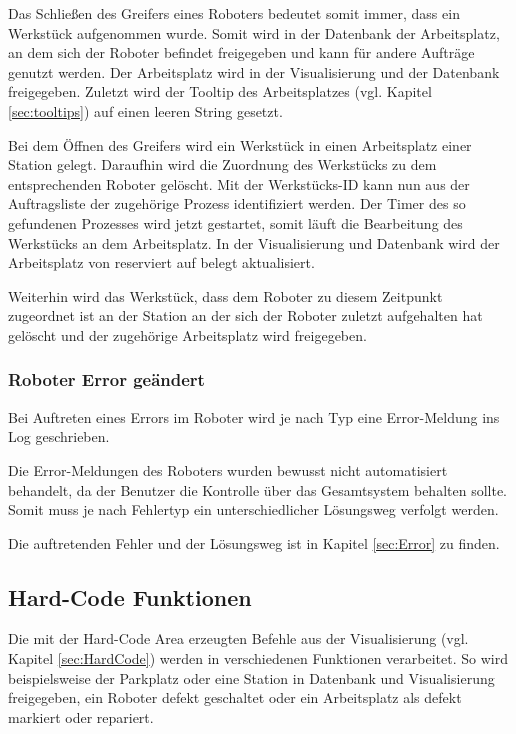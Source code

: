 Das Schließen des Greifers eines Roboters bedeutet somit immer, dass ein Werkstück aufgenommen wurde. Somit wird in der Datenbank der Arbeitsplatz, an dem sich der Roboter befindet freigegeben und kann für andere Aufträge genutzt werden. Der Arbeitsplatz wird in der Visualisierung und der Datenbank freigegeben. Zuletzt wird der Tooltip des Arbeitsplatzes (vgl. Kapitel \ref{sec:tooltips}) auf einen leeren String gesetzt. 

Bei dem Öffnen des Greifers wird ein Werkstück in einen Arbeitsplatz einer Station gelegt. Daraufhin wird die Zuordnung des Werkstücks zu dem entsprechenden Roboter gelöscht. Mit der Werkstücks-ID kann nun aus der Auftragsliste der zugehörige Prozess identifiziert werden. Der Timer des so gefundenen Prozesses wird jetzt gestartet, somit läuft die Bearbeitung des Werkstücks an dem Arbeitsplatz. In der Visualisierung und Datenbank wird der Arbeitsplatz von reserviert auf belegt aktualisiert.

Weiterhin wird das Werkstück, dass dem Roboter zu diesem Zeitpunkt zugeordnet ist an der Station an der sich der Roboter zuletzt aufgehalten hat gelöscht und der zugehörige Arbeitsplatz wird freigegeben. 

\subsubsection{Roboter Error geändert}

Bei Auftreten eines Errors im Roboter wird je nach Typ eine Error-Meldung ins Log geschrieben. 

Die Error-Meldungen des Roboters wurden bewusst nicht automatisiert behandelt, da der Benutzer die Kontrolle über das Gesamtsystem behalten sollte. Somit muss je nach Fehlertyp ein unterschiedlicher Lösungsweg verfolgt werden. 

Die auftretenden Fehler und der Lösungsweg ist in Kapitel \ref{sec:Error} zu finden. 

\subsection{Hard-Code Funktionen}

Die mit der Hard-Code Area erzeugten Befehle aus der Visualisierung (vgl. Kapitel \ref{sec:HardCode}) werden in verschiedenen Funktionen verarbeitet. So wird beispielsweise der Parkplatz oder eine Station in Datenbank und Visualisierung freigegeben, ein Roboter defekt geschaltet oder ein Arbeitsplatz als defekt markiert oder repariert. 

